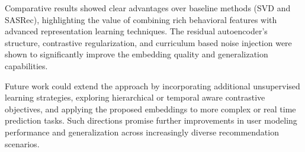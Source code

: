 \documentclass[sigconf]{acmart}
\begin{document}
Comparative results showed clear advantages over baseline methods (SVD and SASRec), highlighting the value of combining rich behavioral features with advanced representation learning techniques. The residual autoencoder’s structure, contrastive regularization, and curriculum based noise injection were shown to significantly improve the embedding quality and generalization capabilities.

Future work could extend the approach by incorporating additional unsupervised learning strategies, exploring hierarchical or temporal aware contrastive objectives, and applying the proposed embeddings to more complex or real time prediction tasks. Such directions promise further improvements in user modeling performance and generalization across increasingly diverse recommendation scenarios.




\end{document}
